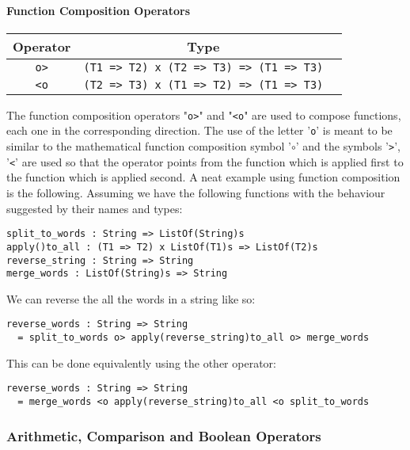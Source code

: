 \documentclass{article}
\begin{document}
\paragraph{Function Composition Operators}
\begin{center}
\begin{tabular}{ |c|c|c| } 
\hline
Operator & Type
\\ 
\hline
\hline
\verb|o>| & \verb|(T1 => T2) x (T2 => T3) => (T1 => T3)|
\\
\hline
\verb|<o| & \verb|(T2 => T3) x (T1 => T2) => (T1 => T3)|
\\
\hline
\end{tabular}
\end{center}
The function composition operators "\verb|o>|" and "\verb|<o|" are used to
compose functions, each one in the corresponding direction. The use of the
letter '\verb|o|' is meant to be similar to the mathematical function
composition symbol '\(\circ\)' and the symbols '\verb|>|', '\verb|<|' are used
so that the operator points from the function which is applied first to the
function which is applied second.  A neat example using function composition is
the following. Assuming we have the following functions with the behaviour
suggested by their names and types: 
\begin{verbatim}
split_to_words : String => ListOf(String)s
apply()to_all : (T1 => T2) x ListOf(T1)s => ListOf(T2)s
reverse_string : String => String
merge_words : ListOf(String)s => String
\end{verbatim}
We can reverse the all the words in a string like so:
\begin{verbatim}
reverse_words : String => String
  = split_to_words o> apply(reverse_string)to_all o> merge_words
\end{verbatim}
This can be done equivalently using the other operator:
\begin{verbatim}
reverse_words : String => String
  = merge_words <o apply(reverse_string)to_all <o split_to_words
\end{verbatim}

\newpage

\subsubsection{Arithmetic, Comparison and Boolean Operators}
\end{document}

